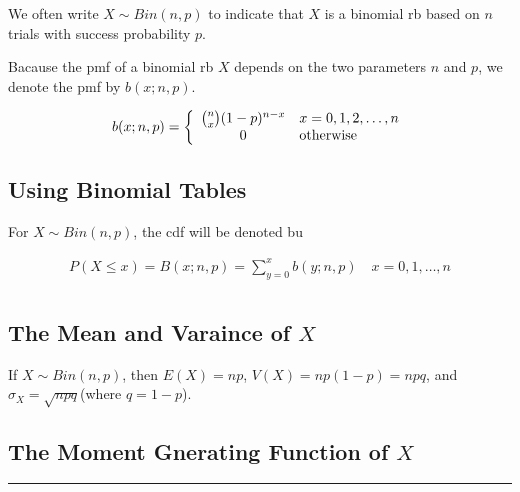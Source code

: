 \begin{notation}
    We often write $X\sim Bin(n, p)$ to indicate that $X$ is a binomial rb based on $n$ trials with success probability $p$.

    Bacause the pmf of a binomial rb $X$ depends on the two parameters $n$ and $p$, we denote the pmf by $b(x; n, p)$.
\end{notation}

\begin{theorem}
    \begin{align*}
        b(x; n, p) = 
        \left\{\begin{array}{cl}
            {n\choose x} (1 - p) ^ {n-x} & x = 0, 1, 2, \dots, n \\
            0 & {\rm otherwise} \\
        \end{array}\right.\\
    \end{align*}
\end{theorem}

\subsection{Using Binomial Tables}

\begin{notation}
    For $X\sim Bin(n, p)$, the cdf will be denoted bu 

    \begin{align*}
        P(X\leq x) = B(x;n,p) = \sum\limits_{y=0}^x b(y;n,p) \quad x=0,1,\dots,n \\
    \end{align*}
\end{notation}

\subsection{The Mean and Varaince of $X$}

\begin{proposition}
    If $X\sim Bin(n,p)$, then $E(X) = np$, $V(X) = np(1-p) = npq$, and $\sigma_X = \sqrt{npq}$(where $q= 1- p$).
\end{proposition}

\subsection{The Moment Gnerating Function of $X$}

\noindent\rule{\textwidth}{1pt}


